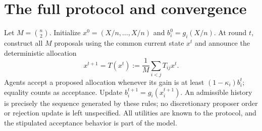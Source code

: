 \documentclass[11pt]{article}
\theoremstyle{remark}\newtheorem{remark}[theorem]{Remark}
\begin{document}
\section*{The full protocol and convergence}
Let $M=\binom n2$. Initialize $x^0=(X/n,\ldots,X/n)$ and $b_i^0=g_i(X/n)$. At round $t$, construct all $M$ proposals using the common current state $x^t$ and announce the deterministic allocation
\[
 x^{t+1}=T(x^t):=\frac1M\sum_{i<j}T_{ij}x^t.
 \tag{2}
\]
Agents accept a proposed allocation whenever its gain is at least $(1-\kappa_i)b_i^t$; equality counts as acceptance. Update $b_i^{t+1}=g_i(x_i^{t+1})$. An admissible history is precisely the sequence generated by these rules; no discretionary proposer order or rejection update is left unspecified. All utilities are known to the protocol, and the stipulated acceptance behavior is part of the model.
\end{document}
